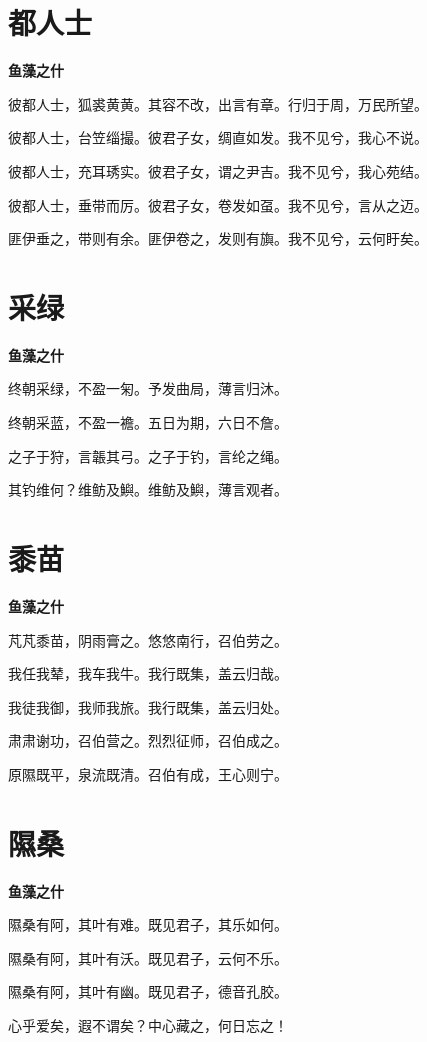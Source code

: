 \documentclass[12pt,a4paper]{ctexbook}
\begin{document}
\section{都人士}
\textbf{鱼藻之什}\par\vspace{0.5em}
彼都人士，狐裘黄黄。其容不改，出言有章。行归于周，万民所望。\par
彼都人士，台笠缁撮。彼君子女，绸直如发。我不见兮，我心不说。\par
彼都人士，充耳琇实。彼君子女，谓之尹吉。我不见兮，我心苑结。\par
彼都人士，垂带而厉。彼君子女，卷发如虿。我不见兮，言从之迈。\par
匪伊垂之，带则有余。匪伊卷之，发则有旟。我不见兮，云何盱矣。\par

\section{采绿}
\textbf{鱼藻之什}\par\vspace{0.5em}
终朝采绿，不盈一匊。予发曲局，薄言归沐。\par
终朝采蓝，不盈一襜。五日为期，六日不詹。\par
之子于狩，言韔其弓。之子于钓，言纶之绳。\par
其钓维何？维鲂及鱮。维鲂及鱮，薄言观者。\par

\section{黍苗}
\textbf{鱼藻之什}\par\vspace{0.5em}
芃芃黍苗，阴雨膏之。悠悠南行，召伯劳之。\par
我任我辇，我车我牛。我行既集，盖云归哉。\par
我徒我御，我师我旅。我行既集，盖云归处。\par
肃肃谢功，召伯营之。烈烈征师，召伯成之。\par
原隰既平，泉流既清。召伯有成，王心则宁。\par

\section{隰桑}
\textbf{鱼藻之什}\par\vspace{0.5em}
隰桑有阿，其叶有难。既见君子，其乐如何。\par
隰桑有阿，其叶有沃。既见君子，云何不乐。\par
隰桑有阿，其叶有幽。既见君子，德音孔胶。\par
心乎爱矣，遐不谓矣？中心藏之，何日忘之！\par
\end{document}
